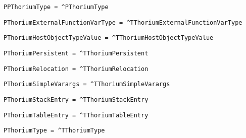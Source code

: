 \begin{verbatim}
PPThoriumType = ^PThoriumType
\end{verbatim}
\label{thoriumcorepkg:thorium:ppthoriumtype}



\begin{verbatim}
PThoriumExternalFunctionVarType = ^TThoriumExternalFunctionVarType
\end{verbatim}
\label{thoriumcorepkg:thorium:pthoriumexternalfunctionvartype}



\begin{verbatim}
PThoriumHostObjectTypeValue = ^TThoriumHostObjectTypeValue
\end{verbatim}
\label{thoriumcorepkg:thorium:pthoriumhostobjecttypevalue}



\begin{verbatim}
PThoriumPersistent = ^TThoriumPersistent
\end{verbatim}
\label{thoriumcorepkg:thorium:pthoriumpersistent}



\begin{verbatim}
PThoriumRelocation = ^TThoriumRelocation
\end{verbatim}
\label{thoriumcorepkg:thorium:pthoriumrelocation}



\begin{verbatim}
PThoriumSimpleVarargs = ^TThoriumSimpleVarargs
\end{verbatim}
\label{thoriumcorepkg:thorium:pthoriumsimplevarargs}



\begin{verbatim}
PThoriumStackEntry = ^TThoriumStackEntry
\end{verbatim}
\label{thoriumcorepkg:thorium:pthoriumstackentry}



\begin{verbatim}
PThoriumTableEntry = ^TThoriumTableEntry
\end{verbatim}
\label{thoriumcorepkg:thorium:pthoriumtableentry}



\begin{verbatim}
PThoriumType = ^TThoriumType
\end{verbatim}
\label{thoriumcorepkg:thorium:pthoriumtype}




